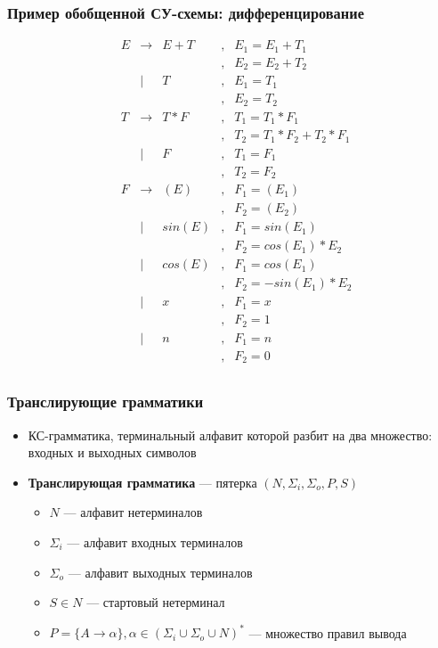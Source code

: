 \documentclass{beamer}
\begin{document}
\begin{frame}[fragile]
  \transwipe[direction=90]
  \frametitle{Пример обобщенной СУ-схемы: дифференцирование}
$$
\begin{array}{ccclcl}
&E& \rightarrow & E + T &,& E_1 = E_1 + T_1 \\
& &             &       &,& E_2 = E_2 + T_2 \\
& &      |      &     T &,& E_1 = T_1 \\
& &             &       &,& E_2 = T_2 \\

&T& \rightarrow & T * F &,& T_1 = T_1 * F_1 \\
& &             &       &,& T_2 = T_1 * F_2 + T_2 * F_1\\
& &      |      &     F &,& T_1 = F_1 \\
& &             &       &,& T_2 = F_2 \\

&F& \rightarrow & ( E ) &,& F_1 = (E_1) \\
& &             &       &,& F_2 = (E_2) \\
& &      |      & sin(E)&,& F_1 = sin(E_1) \\
& &             &       &,& F_2 = cos(E_1) * E_2 \\
& &      |      & cos(E)&,& F_1 = cos(E_1) \\
& &             &       &,& F_2 = -sin(E_1) * E_2 \\
& &      |      &    x  &,& F_1 = x \\
& &             &       &,& F_2 = 1 \\
& &      |      &    n  &,& F_1 = n \\
& &             &       &,& F_2 = 0 \\
\end{array}
$$
\end{frame}

\begin{frame}[fragile]
  \transwipe[direction=90]
  \frametitle{Транслирующие грамматики}
  \begin{itemize}
    \item КС-грамматика, терминальный алфавит которой разбит на два множество: входных и выходных символов
    \item \textbf{Транслирующая грамматика} --- пятерка $(N, \Sigma_i, \Sigma_o, P, S)$
    \begin{itemize}
      \item $N$ --- алфавит нетерминалов
      \item $\Sigma_i$ --- алфавит входных терминалов
      \item $\Sigma_o$ --- алфавит выходных терминалов
      \item $S \in N$ --- стартовый нетерминал
      \item $P = \{ A \rightarrow \alpha \}, \alpha \in (\Sigma_i \cup \Sigma_o \cup N)^*$ --- множество правил вывода
    \end{itemize}
  \end{itemize}
\end{frame}
\end{document}
